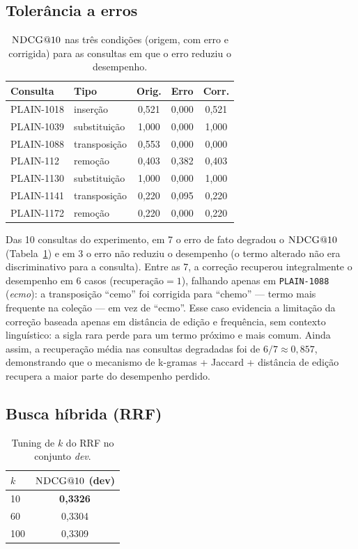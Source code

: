 \documentclass[9pt,a4paper,twocolumn]{article}
\newcommand{\rrf}{\textsc{RRF}}
\newcommand{\ndcg}{\textsc{NDCG}}
\begin{document}
\subsection{Tolerância a erros}

\begin{table}[h]
\centering
\small
\begin{tabular}{l l c c c}
\toprule
Consulta & Tipo & Orig. & Erro & Corr.\\
\midrule
PLAIN-1018 & inserção & 0{,}521 & 0{,}000 & 0{,}521\\
PLAIN-1039 & substituição & 1{,}000 & 0{,}000 & 1{,}000\\
PLAIN-1088 & transposição & 0{,}553 & 0{,}000 & 0{,}000\\
PLAIN-112 & remoção & 0{,}403 & 0{,}382 & 0{,}403\\
PLAIN-1130 & substituição & 1{,}000 & 0{,}000 & 1{,}000\\
PLAIN-1141 & transposição & 0{,}220 & 0{,}095 & 0{,}220\\
PLAIN-1172 & remoção & 0{,}220 & 0{,}000 & 0{,}220\\
\bottomrule
\end{tabular}
\caption{$\ndcg{}@10$ nas três condições (origem, com erro e corrigida) para as consultas em que o
erro reduziu o desempenho.}
\label{tab:typo}
\end{table}

Das 10 consultas do experimento, em 7 o erro de fato degradou o $\ndcg{}@10$ (Tabela~\ref{tab:typo})
e em 3 o erro não reduziu o desempenho (o termo alterado não era discriminativo para a consulta).
Entre as 7, a correção recuperou integralmente o desempenho em 6 casos ($\mathrm{recuperação}=1$),
falhando apenas em \texttt{PLAIN-1088} (\emph{ecmo}): a transposição ``cemo'' foi corrigida para
``chemo'' --- termo mais frequente na coleção --- em vez de ``ecmo''. Esse caso evidencia a
limitação da correção baseada apenas em distância de edição e frequência, sem contexto
linguístico: a sigla rara perde para um termo próximo e mais comum. Ainda assim, a recuperação
média nas consultas degradadas foi de $6/7\approx0{,}857$, demonstrando que o mecanismo de
k-gramas + Jaccard + distância de edição recupera a maior parte do desempenho perdido.

\subsection{Busca híbrida (\rrf{})}

\begin{table}[h]
\centering
\small
\begin{tabular}{lc}
\toprule
$k$ & $\ndcg{}@10$ (dev)\\
\midrule
10 & \textbf{0{,}3326}\\
60 & 0{,}3304\\
100 & 0{,}3309\\
\bottomrule
\end{tabular}
\caption{Tuning de $k$ do \rrf{} no conjunto \emph{dev}.}
\label{tab:rrfk}
\end{table}
\end{document}
